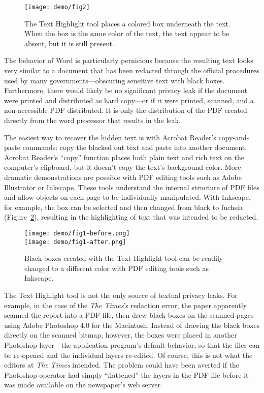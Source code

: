 \begin{figure}
\texttt{[image: demo/fig2]}
\caption{The Text Highlight tool places a colored box underneath the
  text. When the box is the same color of the text, the text appear to
  be absent, but it is still present.}\label{demo1}
\end{figure}

The behavior of Word is particularly pernicious because the resulting
text looks very similar to a document that has been redacted through
the official procedures used by many governments---obscuring sensitive
text with black boxes. Furthermore, there would likely be no
significant privacy leak if the document were printed and
distributed as hard copy---or if it were printed, scanned, and a non-accessible PDF
distributed. It is only the distribution of the PDF created directly
from the word processor that results in the leak.

The easiest way to recover the hidden text is with Acrobat Reader's
copy-and-paste commands:  copy the blacked out text and paste into
another document. Acrobat Reader's ``copy'' function places both plain text
and rich text on the computer's clipboard, but it doesn't copy the
text's background color. More dramatic demonstrations are possible
with PDF editing tools such as Adobe Illustrator or Inkscape. These tools understand the internal structure of PDF files
and allow objects on each page to be individually manipulated. With
Inkscape, for example, the box can be selected and then changed
from black to fuchsia (Figure~\ref{fuschia}), resulting in the highlighting of text that was intended to be
redacted. 

\begin{figure}
\texttt{[image: demo/fig1-before.png]}\\
\texttt{[image: demo/fig1-after.png]}
\caption{Black boxes created with the Text Highlight tool can be
  readily changed to a different color with PDF editing tools such as Inkscape.}\label{fuschia}
\end{figure}

The Text Highlight tool is not the only source of textual privacy
leaks. For example, in the case of the \emph{The
  Times}'s redaction error, the paper apparently scanned the report
into a PDF file, then
drew black boxes on the scanned pages using Adobe Photoshop 4.0 for
the Macintosh. Instead of drawing the black boxes directly on the
scanned bitmap, however, the boxes were placed in another Photoshop
layer---the application program's default behavior, so that
the files can be re-opened and the individual layers re-edited. Of course, this is not what
the editors at \emph{The Times}  intended. The problem could have
been averted if the Photoshop operator had simply ``flattened'' the
layers in the PDF file before it was made available on the newspaper's web server. 

